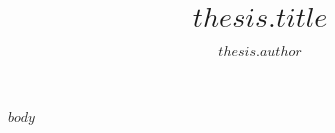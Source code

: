 \documentclass[12pt, b5paper,twoside]{upfthesis}
\title{$thesis.title$}
\author{$thesis.author$}
\begin{document}
\frontmatter

\maketitle

$body$

\backmatter

\printindex
\end{document}
